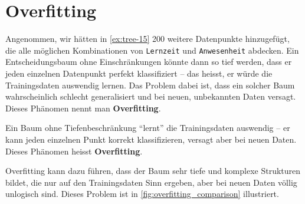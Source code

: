 \section{Overfitting}
Angenommen, wir hätten in \cref{ex:tree-15} 200 weitere Datenpunkte hinzugefügt, die alle möglichen Kombinationen von \texttt{Lernzeit} und \texttt{Anwesenheit} abdecken. Ein Entscheidungsbaum ohne Einschränkungen könnte dann so tief werden, dass er jeden einzelnen Datenpunkt perfekt klassifiziert -- das heisst, er würde die Trainingsdaten auswendig lernen. Das Problem dabei ist, dass ein solcher Baum wahrscheinlich schlecht generalisiert und bei neuen, unbekannten Daten versagt. Dieses Phänomen nennt man \textbf{Overfitting}.

\begin{myattention}[Overfitting]
    Ein Baum ohne Tiefenbeschränkung \enquote{lernt} die Trainingsdaten auswendig --
    er kann jeden einzelnen Punkt korrekt klassifizieren, versagt aber bei neuen Daten.
    Dieses Phänomen heisst \textbf{Overfitting}.

    Overfitting kann dazu führen, dass der Baum sehr tiefe und komplexe Strukturen bildet, die nur auf den Trainingsdaten Sinn ergeben, aber bei neuen Daten völlig unlogisch sind. Dieses Problem ist in \cref{fig:overfitting_comparison} illustriert.


\end{myattention}
